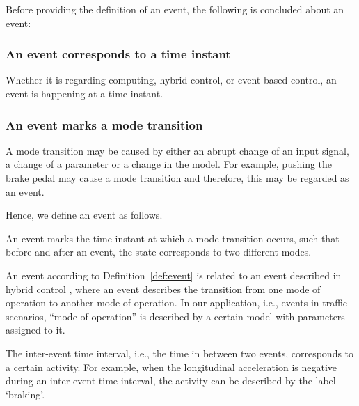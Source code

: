 Before providing the definition of an event, the following is concluded about an event:

\subsubsection{An event corresponds to a time instant}
Whether it is regarding computing, %
hybrid control, or event-based control, an event is happening at a time instant.

\subsubsection{An event marks a mode transition}
A mode transition may be caused by either an abrupt change of an input signal, a change of a parameter or a change in the model. For example, pushing the brake pedal may cause a mode transition and therefore, this may be regarded as an event. 


Hence, we define an event as follows.
\begin{definition}[Event] \label{def:event}
	An event marks the time instant at which a mode transition occurs, such that before and after an event, the state corresponds to two different modes.
\end{definition}

An event according to Definition~\ref{def:event} is related to an event described in hybrid control \cite{deschutter2000optimal}, where an event describes the transition from one mode of operation to another mode of operation. In our application, i.e., events in traffic scenarios, ``mode of operation'' is described by a certain model with parameters assigned to it.

The inter-event time interval, i.e., the time in between two events, corresponds to a certain activity. For example, when the longitudinal acceleration is negative during an inter-event time interval, the activity can be described by the label `braking'.
